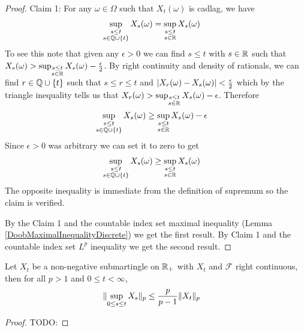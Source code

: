 \begin{proof}
Claim 1:  For any $\omega \in \Omega$ such that
$X_t(\omega)$ is cadlag, we have
\begin{align*}
\sup_{\substack{s \leq t \\ s \in \mathbb{Q} \cup \lbrace t \rbrace }}
X_s(\omega) &= \sup_{\substack{s \leq t \\ s \in \mathbb{R} }}
X_s(\omega)
\end{align*}
To see this note that given any $\epsilon > 0$ we can find $s \leq t$
with $s \in \mathbb{R}$ such that $X_s(\omega) > \sup_{\substack{s \leq t \\ s \in \mathbb{R} }}
X_s(\omega) - \frac{\epsilon}{2}$.  By right continuity and density of
rationals, we can find
$r \in \mathbb{Q} \cup \lbrace t \rbrace$ such that $s \leq r \leq t$
and $\left \vert X_r(\omega) - X_s(\omega) \right \vert < \frac{\epsilon}{2}$ which by
the triangle inequality tells us that $X_r(\omega) > \sup_{\substack{s \leq t \\ s \in \mathbb{R} }}
X_s(\omega) - \epsilon$.  Therefore 
\begin{align*}
\sup_{\substack{s \leq t \\ s \in \mathbb{Q} \cup \lbrace t \rbrace }}
X_s(\omega) &\geq \sup_{\substack{s \leq t \\ s \in \mathbb{R} }}
X_s(\omega) -\epsilon
\end{align*}  Since $\epsilon > 0$ was arbitrary we can set
it to zero to get 
\begin{align*}
\sup_{\substack{s \leq t \\ s \in \mathbb{Q} \cup \lbrace t \rbrace }}
X_s(\omega) &\geq \sup_{\substack{s \leq t \\ s \in \mathbb{R} }}
X_s(\omega)
\end{align*}
The opposite inequality is immediate from the definition of supremum
so the claim is verified.

By the Claim 1 and the countable index set maximal inequality (Lemma
\ref{DoobMaximalInequalityDiscrete}) we get the first result.  By
Claim 1 and the countable index set $L^p$ inequality we get the second result.
\end{proof}

\begin{lem}\label{DoobLpInequalityContinuous}Let $X_t$ be a
  non-negative submartingle on $\mathbb{R}_+$ with $X_t$ and $\mathcal{F}$ right continuous, then for all
  $p > 1$ and $0 \leq t < \infty$,
\begin{align*}
\lVert \sup_{0 \leq s \leq t} X_s \rVert_p &\leq \frac{p}{p-1}\lVert X_t \rVert_p
\end{align*}
\end{lem}
\begin{proof}
TODO:
\end{proof}

